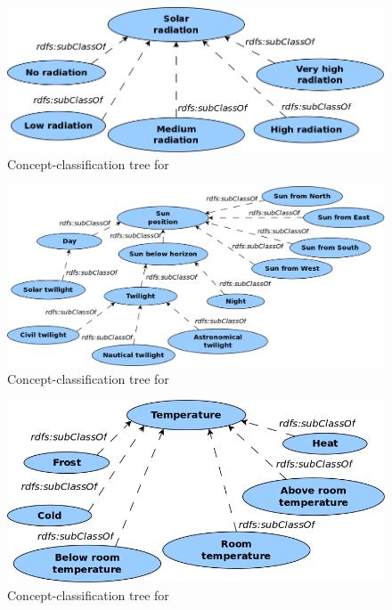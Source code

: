 \begin{figure}
  \centering
  \includegraphics[width=.8\textwidth]{figures/diagrams/solar-radiation.png}
  \caption{Concept-classification tree for }
  \label{fig:tree_solar_radiation}
\end{figure}

\begin{figure}
  \centering
  \includegraphics[width=.8\textwidth]{figures/diagrams/sun-position.png}
  \caption{Concept-classification tree for }
  \label{fig:tree_sun_position}
\end{figure}

\begin{figure}
  \centering
  \includegraphics[width=.8\textwidth]{figures/diagrams/temperature.png}
  \caption{Concept-classification tree for }
  \label{fig:tree_temperature}
\end{figure}

